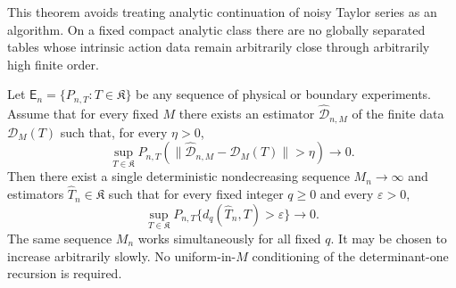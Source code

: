 This theorem avoids treating analytic continuation of noisy Taylor series as
an algorithm.  On a fixed compact analytic class there are no globally
separated tables whose intrinsic action data remain arbitrarily close through
arbitrarily high finite order.

\begin{theorem}
\label{thm:v23-diagonal-global-reconstruction}
Let \(\mathsf E_n=\{P_{n,T}:T\in\mathfrak K\}\) be any sequence of physical or
boundary experiments.  Assume that for every fixed \(M\) there exists an
estimator \(\widehat{\mathcal D}_{n,M}\) of the finite data
\(\mathcal D_M(T)\) such that, for every \(\eta>0\),
\begin{equation}\label{eq:v23-fixed-M-consistency}
 \sup_{T\in\mathfrak K}
 P_{n,T}\!\left(
   \|\widehat{\mathcal D}_{n,M}-\mathcal D_M(T)\|>\eta
 \right)\longrightarrow0.
\end{equation}
Then there exist a single deterministic nondecreasing sequence
\(M_n\to\infty\) and estimators \(\widehat T_n\in\mathfrak K\) such that for
every fixed integer \(q\ge0\) and every \(\varepsilon>0\),
\begin{equation}\label{eq:v23-global-consistency}
 \sup_{T\in\mathfrak K}
 P_{n,T}\{d_q(\widehat T_n,T)>\varepsilon\}
 \longrightarrow0.
\end{equation}
The same sequence \(M_n\) works simultaneously for all fixed \(q\).  It may
be chosen to increase arbitrarily slowly.  No uniform-in-\(M\) conditioning of
the determinant-one recursion is required.
\end{theorem}

